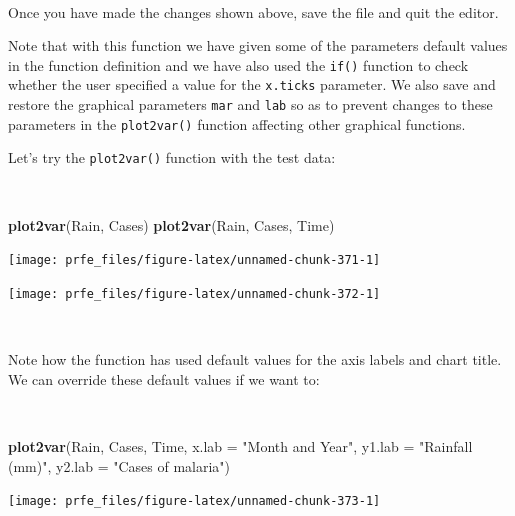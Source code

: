 \documentclass[12pt,a4paper]{book}
\newenvironment{Shaded}{\begin{snugshade}}{\end{snugshade}}
\newcommand{\KeywordTok}[1]{\textcolor[rgb]{0.13,0.29,0.53}{\textbf{#1}}}
\newcommand{\DataTypeTok}[1]{\textcolor[rgb]{0.13,0.29,0.53}{#1}}
\newcommand{\StringTok}[1]{\textcolor[rgb]{0.31,0.60,0.02}{#1}}
\newcommand{\NormalTok}[1]{#1}
\theoremstyle{definition}
\theoremstyle{definition}
\theoremstyle{definition}
\theoremstyle{remark}
\begin{document}
~

Once you have made the changes shown above, save the file and quit the
editor.

Note that with this function we have given some of the parameters
default values in the function definition and we have also used the
\texttt{if()} function to check whether the user specified a value for
the \texttt{x.ticks} parameter. We also save and restore the graphical
parameters \texttt{mar} and \texttt{lab} so as to prevent changes to
these parameters in the \texttt{plot2var()} function affecting other
graphical functions.

Let's try the \texttt{plot2var()} function with the test data:

~

\begin{Shaded}
\begin{Highlighting}[]
\KeywordTok{plot2var}\NormalTok{(Rain, Cases)}
\KeywordTok{plot2var}\NormalTok{(Rain, Cases, Time)}
\end{Highlighting}
\end{Shaded}

\begin{center}\texttt{[image: prfe\_files/figure-latex/unnamed-chunk-371-1]} \end{center}

\newpage

\begin{center}\texttt{[image: prfe\_files/figure-latex/unnamed-chunk-372-1]} \end{center}

~

Note how the function has used default values for the axis labels and
chart title. We can override these default values if we want to:

~

\begin{Shaded}
\begin{Highlighting}[]
\KeywordTok{plot2var}\NormalTok{(Rain, Cases, Time, }\DataTypeTok{x.lab =} \StringTok{"Month and Year"}\NormalTok{,}
         \DataTypeTok{y1.lab =} \StringTok{"Rainfall (mm)"}\NormalTok{, }\DataTypeTok{y2.lab =} \StringTok{"Cases of malaria"}\NormalTok{)}
\end{Highlighting}
\end{Shaded}

\begin{center}\texttt{[image: prfe\_files/figure-latex/unnamed-chunk-373-1]} \end{center}
\end{document}
